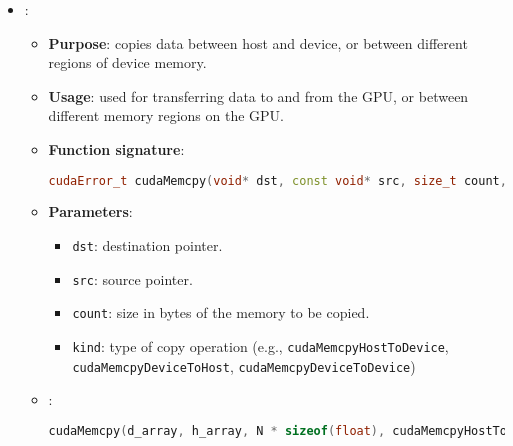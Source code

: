\begin{itemize}
    \item {}:
    \begin{itemize}
        \item \textbf{Purpose}: copies data between host and device, or between different regions of device memory.
        \item \textbf{Usage}: used for transferring data to and from the GPU, or between different memory regions on the GPU.
        \item \textbf{Function signature}:
        \begin{lstlisting}[language=C++]
cudaError_t cudaMemcpy(void* dst, const void* src, size_t count, cudaMemcpyKind kind);\end{lstlisting}
        \item \textbf{Parameters}:
        \begin{itemize}
            \item \texttt{dst}: destination pointer.
            \item \texttt{src}: source pointer.
            \item \texttt{count}: size in bytes of the memory to be copied.
            \item \texttt{kind}: type of copy operation (e.g., \texttt{cudaMemcpyHostToDevice}, \texttt{cudaMemcpyDeviceToHost}, \texttt{cudaMemcpyDeviceToDevice})
        \end{itemize}
        \item {}:
        \begin{lstlisting}[language=C++]
cudaMemcpy(d_array, h_array, N * sizeof(float), cudaMemcpyHostToDevice);\end{lstlisting}
    \end{itemize}
\end{itemize}

